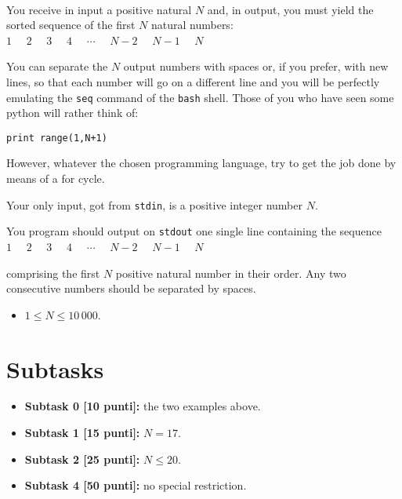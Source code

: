\renewcommand{\nomebreve}{for1\_std}
\renewcommand{\titolo}{First exercise on {\tt for} - emulate the {\tt seq} command}

\mbox{\ }
\vspace{-1.6cm}


\introduzione{}

You receive in input a positive natural $N$ and,
in output, you must yield the sorted sequence of the first $N$ natural numbers:\\

  $1$  \ \ $2$  \ \ $3$  \ \ $4$  \ \ $\cdots$  \ \ $N-2$  \ \ $N-1$  \ \ $N$

You can separate the $N$ output numbers with spaces or, if you prefer,
with new lines, so that each number will go on a different line and you will be perfectly emulating the \verb'seq' command of the \verb'bash' shell.
Those of you who have seen some python will rather think of:

\verb'print range(1,N+1)'

However, whatever the chosen programming language, try to get the job done by means of a for cycle. 

Your only input, got from \verb'stdin', is a positive integer number $N$.

You program should output on \verb'stdout' one single line containing the sequence\\

  $1$  \ \ $2$  \ \ $3$  \ \ $4$  \ \ $\cdots$  \ \ $N-2$  \ \ $N-1$  \ \ $N$

comprising the first $N$ positive natural number in their order.
Any two consecutive numbers should be separated by spaces.



\begin{itemize}[nolistsep, noitemsep]
  \item $1 \le N \le 10\,000$.
\end{itemize}
  
  \section*{Subtasks}
  \begin{itemize}
    \item \textbf{Subtask 0 [10 punti]:} the two examples above.
    \item \textbf{Subtask 1 [15 punti]:} $N = 17$.
    \item \textbf{Subtask 2 [25 punti]:} $N \leq 20$.
    \item \textbf{Subtask 4 [50 punti]:} no special restriction.
  \end{itemize}
  
